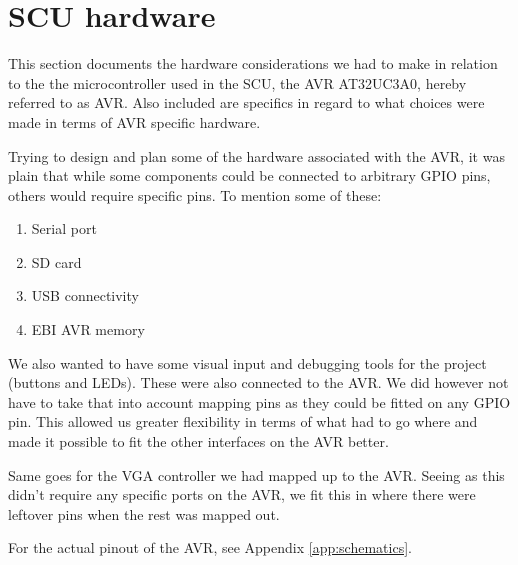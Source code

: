 \section{SCU hardware}

This section documents the hardware considerations we had to make in relation
to the the microcontroller used in the SCU, the AVR AT32UC3A0, hereby referred
to as AVR. Also included are specifics in regard to what choices were made in
terms of AVR specific hardware. 

Trying to design and plan some of the hardware associated with the AVR, it was
plain that while some components could be connected to arbitrary GPIO pins,
others would require specific pins. To mention some of these:

\begin{enumerate}
\item Serial port
\item \ac{SD} card
\item \ac{USB} connectivity
\item \ac{EBI} AVR memory
\end{enumerate}

We also wanted to have some visual input and debugging tools for the project
(buttons and LEDs). These were also connected to the AVR. We did however not
have to take that into account mapping pins as they could be fitted on any
\ac{GPIO} pin. This allowed us greater flexibility in terms of what had to go
where and made it possible to fit the other interfaces on the AVR better.

Same goes for the \ac{VGA} controller we had mapped up to the AVR. Seeing
as this didn't require any specific ports on the AVR, we fit this in where
there were leftover pins when the rest was mapped out.

For the actual pinout of the AVR, see Appendix \ref{app:schematics}.

